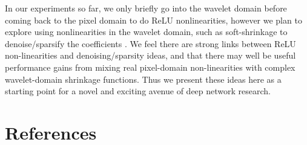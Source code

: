 \documentclass[9pt]{article}
\begin{document}
In our experiments so far, we only briefly go into the wavelet domain before coming back to the
pixel domain to do ReLU nonlinearities, however we plan to explore using nonlinearities in the
wavelet domain, such as soft-shrinkage to denoise/sparsify the coefficients
\cite{donoho_ideal_1994}. We feel there are strong links between ReLU non-linearities and
denoising/sparsity ideas, and that there may well be useful performance gains from mixing real
pixel-domain non-linearities with complex wavelet-domain shrinkage functions. Thus we present these
ideas here as a starting point for a novel and exciting avenue of deep network research.




\section*{References}
\printbibliography[heading=none]
\end{document}
